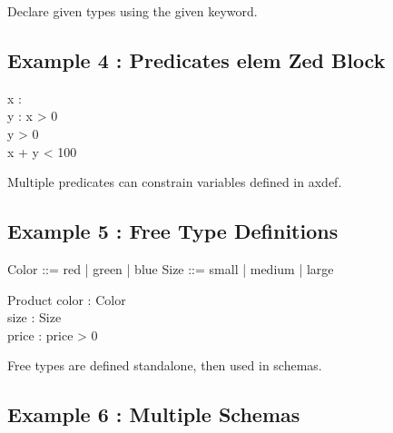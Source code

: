 \documentclass[a4paper,10pt,fleqn]{article}
\begin{document}
\noindent Declare given types using the given keyword.

\bigskip

\subsection*{Example 4 : Predicates elem Zed Block}

\begin{axdef}
x : \nat \\
y : \nat
\where
x > 0 \\
y > 0 \\
x + y < 100
\end{axdef}

\noindent Multiple predicates can constrain variables defined in axdef.

\bigskip

\subsection*{Example 5 : Free Type Definitions}

\begin{zed}
Color ::= red | green | blue
\also
Size ::= small | medium | large
\end{zed}

\begin{schema}{Product}
color : Color \\
size : Size \\
price : \nat
\where
price > 0
\end{schema}

\noindent Free types are defined standalone, then used in schemas.

\bigskip

\subsection*{Example 6 : Multiple Schemas}

\begin{zed}
\end{zed}

\end{document}
